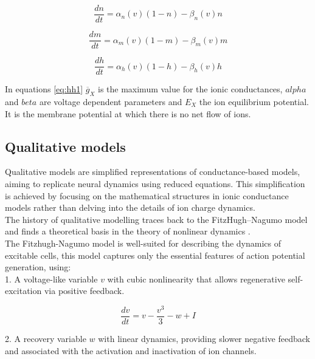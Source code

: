 \begin{equation}
    \frac{dn}{dt}=\alpha_n\left(v\right)\left(1-n\right)-\beta_n\left(v\right)n
    \label{eq:hh2}
\end{equation}

\begin{equation}
    \frac{dm}{dt}=\alpha_m\left(v\right)\left(1-m\right)-\beta_m\left(v\right)m
    \label{eq:hh3}
\end{equation}

\begin{equation}
    \frac{dh}{dt}=\alpha_h\left(v\right)\left(1-h\right)-\beta_h\left(v\right)h
    \label{eq:hh4}
\end{equation}

In equations \ref{eq:hh1} \({\overline{g}}_{X}\) is the maximum value for the ionic conductances,
\(alpha\) and \(beta\) are voltage dependent parameters and
\(E_{X}\) the ion equilibrium potential. It is the membrane potential at which there is no net flow of ions.\\


\subsection{Qualitative models}
Qualitative models are simplified representations of conductance-based models, aiming to replicate neural dynamics using reduced equations. This simplification is achieved by focusing on the mathematical structures in ionic conductance models rather than delving into the details of ion charge dynamics.\\
The history of qualitative modelling traces back to the FitzHugh–Nagumo model \cite{FitzHugh,Nagumo} and finds a theoretical basis in the theory of nonlinear dynamics \cite{Kepler,Rinzel,Strogatz,Izhikevich2007}.\\

The Fitzhugh-Nagumo model is well-suited for describing the dynamics of excitable cells, this model captures only the essential features of action potential generation, using:\\

1.	A voltage-like variable $v$ with cubic nonlinearity that allows regenerative self-excitation via positive feedback.

\begin{equation}
    \frac{dv}{dt}=v-\frac{v^3}{3}-w+I
    \label{eq:fn1}
\end{equation}


2.	A recovery variable $w$ with linear dynamics, providing slower negative feedback and associated with the activation and inactivation of ion channels.

